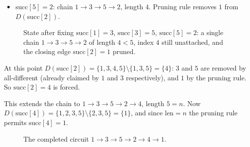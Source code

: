 \documentclass[11pt]{article}
\begin{document}
\begin{itemize}
    \item $\text{succ}[5]=2$: chain $1\to3\to5\to2$, length $4$. Pruning rule removes $1$ from $D(\text{succ}[2])$.
\end{itemize}

\begin{figure}[H]
    \centering
    \caption{State after fixing $\text{succ}[1]=3$, $\text{succ}[3]=5$, $\text{succ}[5]=2$: a single chain $1\to3\to5\to2$ of length $4<5$, index $4$ still unattached, and the closing edge $\text{succ}[2]=1$ pruned.}
    \label{fig:partial-chain}
\end{figure}

At this point $D(\text{succ}[2]) = \{1,3,4,5\}\setminus\{1,3,5\} = \{4\}$: $3$ and $5$ are removed by all-different (already claimed by $1$ and $3$ respectively), and $1$ by the pruning rule. So $\text{succ}[2]=4$ is forced.

This extends the chain to $1\to3\to5\to2\to4$, length $5=n$. Now $D(\text{succ}[4]) = \{1,2,3,5\}\setminus\{2,3,5\}=\{1\}$, and since $\text{len}=n$ the pruning rule permits $\text{succ}[4]=1$.

\begin{figure}[H]
    \centering
    \caption{The completed circuit $1\to3\to5\to2\to4\to1$.}
    \label{fig:full-circuit}
\end{figure}
\end{document}
